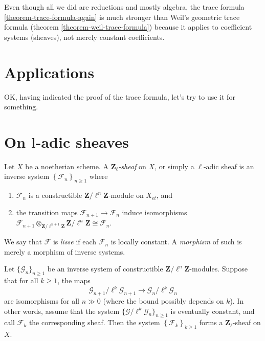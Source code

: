 \begin{remark}
\label{remark-stronger}
Even though all we did are reductions and mostly algebra, the trace formula
\ref{theorem-trace-formula-again} is much stronger than Weil's geometric trace
formula (theorem \ref{theorem-weil-trace-formula})
because it applies to coefficient
systems (sheaves), not merely constant coefficients.
\end{remark}


\section{Applications}
\label{section-applications}

\noindent
OK, having indicated the proof of the trace formula, let's try to use it
for something.





\section{On l-adic sheaves}
\label{section-l-adic-sheaves}

\begin{definition}
\label{definition-l-adic-sheaf}
Let $X$ be a noetherian scheme. A
{\it $\mathbf{Z}_\ell$-sheaf} on $X$, or simply a
{$\ell$-adic sheaf} is an
inverse system $\left\{\mathcal{F}_n\right\}_{n\geq 1}$ where
\begin{enumerate}
\item
$\mathcal{F}_n$ is a constructible $\mathbf{Z}/\ell^n\mathbf{Z}$-module on
$X_{et}$, and
\item
the transition maps $\mathcal{F}_{n+1}\to \mathcal{F}_n$ induce isomorphisms
$\mathcal{F}_{n+1}\otimes_{\mathbf{Z}/\ell^{n+1}\mathbf{Z}}
\mathbf{Z}/\ell^n\mathbf{Z} \cong \mathcal{F}_n$.
\end{enumerate}
We say that $\mathcal{F}$ is {\it lisse} if each $\mathcal{F}_n$ is locally
constant. A {\it morphism} of such is merely a morphism of inverse systems.
\end{definition}

\begin{lemma}
\label{lemma-eventually-constant}
Let $\{\mathcal{G}_n\}_{n\geq 1}$ be an inverse system of constructible
$\mathbf{Z}/\ell^n\mathbf{Z}$-modules.
Suppose that for all $k\geq 1$, the maps
$$
\mathcal{G}_{n+1}/\ell^k \mathcal{G}_{n+1}\to \mathcal{G}_n /\ell^k
\mathcal{G}_n
$$
are isomorphisms for all $n\gg 0$ (where the bound possibly depends on $k$).
In other words, assume that the system
$\{\mathcal{G}/\ell^k\mathcal{G}_n\}_{n\geq 1}$
is eventually constant, and call $\mathcal{F}_k$ the corresponding sheaf.
Then the system $\left\{\mathcal{F}_k\right\}_{k\geq 1}$ forms a
$\mathbf{Z}_\ell$-sheaf on $X$.
\end{lemma}

